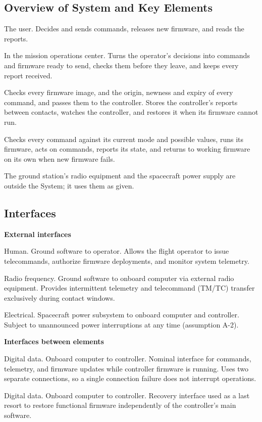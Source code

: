 \documentclass[11pt,a4paper]{article}
\begin{document}
\subsection{Overview of System and Key Elements}
\begin{description}[leftmargin=4.4cm]
\item[Operator] The user. Decides and sends commands, releases new firmware,
  and reads the reports.
\item[Ground software] In the mission operations center. Turns the operator's
  decisions into commands and firmware ready to send, checks them before they
  leave, and keeps every report received.
\item[Onboard computer] Checks every firmware image, and the origin, newness
  and expiry of every command, and passes them to the controller. Stores the
  controller's reports between contacts, watches the controller, and restores
  it when its firmware cannot run.
\item[Controller] Checks every command against its current mode and possible
  values, runs its firmware, acts on commands, reports its state, and returns
  to working firmware on its own when new firmware fails.
\end{description}
The ground station's radio equipment and the spacecraft power supply are
outside the System; it uses them as given.

\subsection{Interfaces}
\noindent\textbf{External interfaces}
\begin{description}[leftmargin=4.4cm]
\item[Operator interface] Human. Ground software to operator. Allows the
  flight operator to issue telecommands, authorize firmware deployments, and
  monitor system telemetry.
\item[Radio link] Radio frequency. Ground software to onboard computer via
  external radio equipment. Provides intermittent telemetry and telecommand
  (TM/TC) transfer exclusively during contact windows.
\item[Power] Electrical. Spacecraft power subsystem to onboard computer and
  controller. Subject to unannounced power interruptions at any time
  (assumption A-2).
\end{description}

\medskip
\noindent\textbf{Interfaces between elements}
\begin{description}[leftmargin=4.4cm]
\item[Data link] Digital data. Onboard computer to controller. Nominal
  interface for commands, telemetry, and firmware updates while controller
  firmware is running. Uses two separate connections, so a single connection
  failure does not interrupt operations.
\item[Reprogramming link] Digital data. Onboard computer to controller.
  Recovery interface used as a last resort to restore functional firmware
  independently of the controller's main software.
\end{description}
\end{document}
